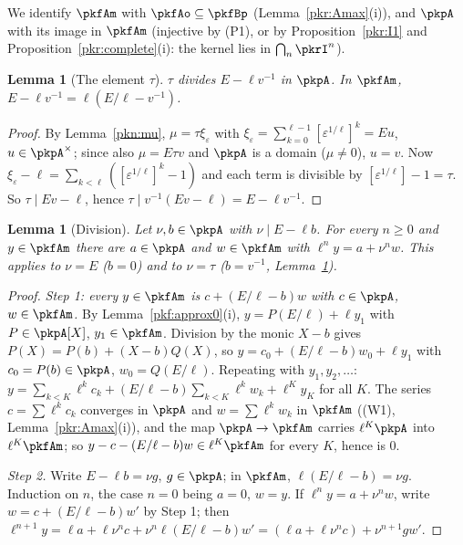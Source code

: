 \documentclass[10pt]{amsart}
\newtheorem{lemma}[theorem]{Lemma}
\theoremstyle{definition}
\theoremstyle{remark}
\begin{document}
We identify $\pkfAm$ with $\pkfAo\subseteq\pkfBp$ (Lemma~\ref{pkr:Amax}(i)), and $\pkpA$ with its image
in $\pkfAm$ (injective by (P1), or by Proposition~\ref{pkr:I1} and Proposition~\ref{pkr:complete}(i):
the kernel lies in $\bigcap_n\pkrI^n$).

\begin{lemma}[The element $\tau$]\label{pkr:tau}
$\tau$ divides $E-\ell v^{-1}$ in $\pkpA$. In $\pkfAm$, $E-\ell v^{-1}=\ell(E/\ell-v^{-1})$.
\end{lemma}

\begin{proof}
By Lemma~\ref{pkn:mu}, $\mu=\tau\xi_\varepsilon$ with $\xi_\varepsilon=\sum_{k=0}^{\ell-1}
[\varepsilon^{1/\ell}]^k=Eu$, $u\in\pkpA^\times$; since also $\mu=E\tau v$ and $\pkpA$ is a domain
($\mu\ne0$), $u=v$. Now $\xi_\varepsilon-\ell=\sum_{k<\ell}([\varepsilon^{1/\ell}]^k-1)$ and each term is
divisible by $[\varepsilon^{1/\ell}]-1=\tau$. So $\tau\mid Ev-\ell$, hence $\tau\mid v^{-1}(Ev-\ell)=
E-\ell v^{-1}$.
\end{proof}

\begin{lemma}[Division]\label{pkr:div}
Let $\nu,b\in\pkpA$ with $\nu\mid E-\ell b$. For every $n\ge0$ and $y\in\pkfAm$ there are $a\in\pkpA$
and $w\in\pkfAm$ with $\ell^ny=a+\nu^nw$. This applies to $\nu=E$ ($b=0$) and to $\nu=\tau$
($b=v^{-1}$, Lemma~\ref{pkr:tau}).
\end{lemma}

\begin{proof}
\emph{Step 1: every $y\in\pkfAm$ is $c+(E/\ell-b)w$ with $c\in\pkpA$, $w\in\pkfAm$.} By
Lemma~\ref{pkf:approx0}(i), $y=P(E/\ell)+\ell y_1$ with $P\in\pkpA[X]$, $y_1\in\pkfAm$. Division by the
monic $X-b$ gives $P(X)=P(b)+(X-b)Q(X)$, so $y=c_0+(E/\ell-b)w_0+\ell y_1$ with $c_0=P(b)\in\pkpA$,
$w_0=Q(E/\ell)$. Repeating with $y_1,y_2,\dots$:
$y=\sum_{k<K}\ell^kc_k+(E/\ell-b)\sum_{k<K}\ell^kw_k+\ell^Ky_K$ for all $K$. The series
$c=\sum\ell^kc_k$ converges in $\pkpA$ and $w=\sum\ell^kw_k$ in $\pkfAm$ ((W1), Lemma~\ref{pkr:Amax}(i)),
and the map $\pkpA\to\pkfAm$ carries $\ell^K\pkpA$ into $\ell^K\pkfAm$; so $y-c-(E/\ell-b)w\in\ell^K
\pkfAm$ for every $K$, hence is $0$.

\emph{Step 2.} Write $E-\ell b=\nu g$, $g\in\pkpA$; in $\pkfAm$, $\ell(E/\ell-b)=\nu g$. Induction on
$n$, the case $n=0$ being $a=0$, $w=y$. If $\ell^ny=a+\nu^nw$, write $w=c+(E/\ell-b)w'$ by Step 1; then
$\ell^{n+1}y=\ell a+\ell\nu^nc+\nu^n\ell(E/\ell-b)w'=(\ell a+\ell\nu^nc)+\nu^{n+1}gw'$.
\end{proof}
\end{document}
